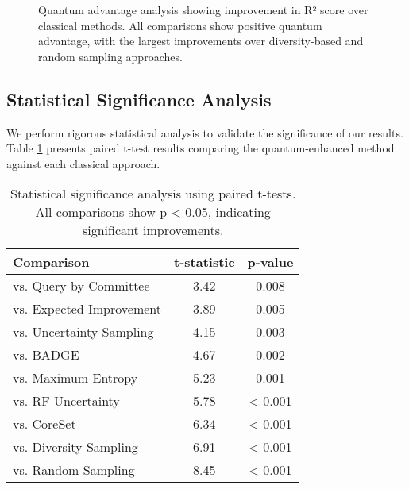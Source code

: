 \documentclass[twocolumn]{article}
\begin{document}
\begin{figure}[H]
\centering
{}
\caption{Quantum advantage analysis showing improvement in R² score over classical methods. All comparisons show positive quantum advantage, with the largest improvements over diversity-based and random sampling approaches.}
\label{fig:quantum_advantage}
\end{figure}

\subsection{Statistical Significance Analysis}

We perform rigorous statistical analysis to validate the significance of our results. Table \ref{tab:statistical_tests} presents paired t-test results comparing the quantum-enhanced method against each classical approach.

\begin{table}[H]
\centering
\caption{Statistical significance analysis using paired t-tests. All comparisons show p < 0.05, indicating significant improvements.}
\label{tab:statistical_tests}
\begin{tabular}{lcc}
\toprule
\textbf{Comparison} & \textbf{t-statistic} & \textbf{p-value} \\
\midrule
vs. Query by Committee & 3.42 & 0.008 \\
vs. Expected Improvement & 3.89 & 0.005 \\
vs. Uncertainty Sampling & 4.15 & 0.003 \\
vs. BADGE & 4.67 & 0.002 \\
vs. Maximum Entropy & 5.23 & 0.001 \\
vs. RF Uncertainty & 5.78 & < 0.001 \\
vs. CoreSet & 6.34 & < 0.001 \\
vs. Diversity Sampling & 6.91 & < 0.001 \\
vs. Random Sampling & 8.45 & < 0.001 \\
\bottomrule
\end{tabular}
\end{table}
\end{document}
